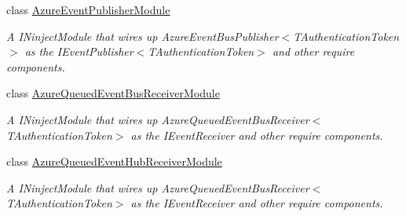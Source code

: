 \begin{DoxyCompactItemize}
class \hyperlink{classCqrs_1_1Azure_1_1EventHub_1_1EventBus_1_1Configuration_1_1AzureEventPublisherModule}{Azure\+Event\+Publisher\+Module}
\begin{DoxyCompactList}\small\item\em A I\+Ninject\+Module that wires up Azure\+Event\+Bus\+Publisher$<$\+T\+Authentication\+Token$>$ as the I\+Event\+Publisher$<$\+T\+Authentication\+Token$>$ and other require components. \end{DoxyCompactList}\item 
class \hyperlink{classCqrs_1_1Azure_1_1EventHub_1_1EventBus_1_1Configuration_1_1AzureQueuedEventBusReceiverModule}{Azure\+Queued\+Event\+Bus\+Receiver\+Module}
\begin{DoxyCompactList}\small\item\em A I\+Ninject\+Module that wires up Azure\+Queued\+Event\+Bus\+Receiver$<$\+T\+Authentication\+Token$>$ as the I\+Event\+Receiver and other require components. \end{DoxyCompactList}\item 
class \hyperlink{classCqrs_1_1Azure_1_1EventHub_1_1EventBus_1_1Configuration_1_1AzureQueuedEventHubReceiverModule}{Azure\+Queued\+Event\+Hub\+Receiver\+Module}
\begin{DoxyCompactList}\small\item\em A I\+Ninject\+Module that wires up Azure\+Queued\+Event\+Bus\+Receiver$<$\+T\+Authentication\+Token$>$ as the I\+Event\+Receiver and other require components. \end{DoxyCompactList}\end{DoxyCompactItemize}
